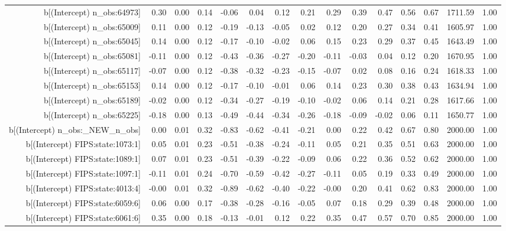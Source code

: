 \begin{table}[ht]
\begin{tabular}{rrrrrrrrrrrrrrr}
  b[(Intercept) n\_obs:64973] & 0.30 & 0.00 & 0.14 & -0.06 & 0.04 & 0.12 & 0.21 & 0.29 & 0.39 & 0.47 & 0.56 & 0.67 & 1711.59 & 1.00 \\ 
  b[(Intercept) n\_obs:65009] & 0.11 & 0.00 & 0.12 & -0.19 & -0.13 & -0.05 & 0.02 & 0.12 & 0.20 & 0.27 & 0.34 & 0.41 & 1605.97 & 1.00 \\ 
  b[(Intercept) n\_obs:65045] & 0.14 & 0.00 & 0.12 & -0.17 & -0.10 & -0.02 & 0.06 & 0.15 & 0.23 & 0.29 & 0.37 & 0.45 & 1643.49 & 1.00 \\ 
  b[(Intercept) n\_obs:65081] & -0.11 & 0.00 & 0.12 & -0.43 & -0.36 & -0.27 & -0.20 & -0.11 & -0.03 & 0.04 & 0.12 & 0.20 & 1670.95 & 1.00 \\ 
  b[(Intercept) n\_obs:65117] & -0.07 & 0.00 & 0.12 & -0.38 & -0.32 & -0.23 & -0.15 & -0.07 & 0.02 & 0.08 & 0.16 & 0.24 & 1618.33 & 1.00 \\ 
  b[(Intercept) n\_obs:65153] & 0.14 & 0.00 & 0.12 & -0.17 & -0.10 & -0.01 & 0.06 & 0.14 & 0.23 & 0.30 & 0.38 & 0.43 & 1634.94 & 1.00 \\ 
  b[(Intercept) n\_obs:65189] & -0.02 & 0.00 & 0.12 & -0.34 & -0.27 & -0.19 & -0.10 & -0.02 & 0.06 & 0.14 & 0.21 & 0.28 & 1617.66 & 1.00 \\ 
  b[(Intercept) n\_obs:65225] & -0.18 & 0.00 & 0.13 & -0.49 & -0.44 & -0.34 & -0.26 & -0.18 & -0.09 & -0.02 & 0.06 & 0.11 & 1650.77 & 1.00 \\ 
  b[(Intercept) n\_obs:\_NEW\_n\_obs] & 0.00 & 0.01 & 0.32 & -0.83 & -0.62 & -0.41 & -0.21 & 0.00 & 0.22 & 0.42 & 0.67 & 0.80 & 2000.00 & 1.00 \\ 
  b[(Intercept) FIPS:state:1073:1] & 0.05 & 0.01 & 0.23 & -0.51 & -0.38 & -0.24 & -0.11 & 0.05 & 0.21 & 0.35 & 0.51 & 0.63 & 2000.00 & 1.00 \\ 
  b[(Intercept) FIPS:state:1089:1] & 0.07 & 0.01 & 0.23 & -0.51 & -0.39 & -0.22 & -0.09 & 0.06 & 0.22 & 0.36 & 0.52 & 0.62 & 2000.00 & 1.00 \\ 
  b[(Intercept) FIPS:state:1097:1] & -0.11 & 0.01 & 0.24 & -0.70 & -0.59 & -0.42 & -0.27 & -0.11 & 0.05 & 0.19 & 0.33 & 0.49 & 2000.00 & 1.00 \\ 
  b[(Intercept) FIPS:state:4013:4] & -0.00 & 0.01 & 0.32 & -0.89 & -0.62 & -0.40 & -0.22 & -0.00 & 0.20 & 0.41 & 0.62 & 0.83 & 2000.00 & 1.00 \\ 
  b[(Intercept) FIPS:state:6059:6] & 0.06 & 0.00 & 0.17 & -0.38 & -0.28 & -0.16 & -0.05 & 0.07 & 0.18 & 0.29 & 0.39 & 0.48 & 2000.00 & 1.00 \\ 
  b[(Intercept) FIPS:state:6061:6] & 0.35 & 0.00 & 0.18 & -0.13 & -0.01 & 0.12 & 0.22 & 0.35 & 0.47 & 0.57 & 0.70 & 0.85 & 2000.00 & 1.00 \\ 

\end{tabular}
\end{table}

